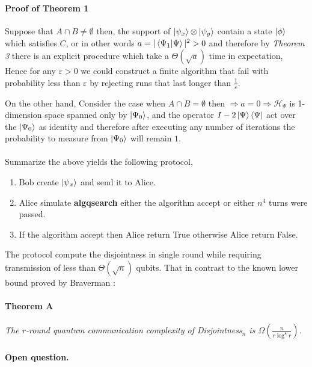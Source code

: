 \documentclass{article}
\begin{document}
\begin{multicols*}{2}
\paragraph{} 

\paragraph{Proof of Theorem 1} 
Suppose that \( A \cap B \neq \emptyset \) then, the support of \( \ket{\psi_x} \otimes \ket{\psi_y} \) contain a state \( \ket{\phi} \) which satisfies \(C\), or in other words $a = |\braket{\Psi_1|\Psi}|^2 > 0 $ and therefore by \textit{Theorem 3} there is an explicit procedure which take a $\Theta(\sqrt{a})$ time in expectation, Hence for any \(\varepsilon >0\) we could construct a finite algorithm that fail with probability less than $ \varepsilon $ by rejecting runs that last longer than $\frac{1}{\varepsilon}$. 
  
On the other hand, Consider the case when \(A \cap B = \emptyset\) then $\Rightarrow a = 0 \Rightarrow \mathcal{H}_{\Psi}$ is 1-dimension space spanned only by $\ket{\Psi_0} $, and the operator $ I - 2 \ket{\Psi}\bra{\Psi} $ act over the $ \ket{\Psi_0}  $ as identity and therefore after executing any number of iterations the probability to measure from $\ket{\Psi_0}$ will remain $1$.

\paragraph{}Summarize the above yields the following protocol,
\begin{enumerate}
    \item Bob create \( \ket{\psi_x} \) and send it to Alice.
    \item Alice simulate \textbf{algqsearch} either the algorithm accept or either $n^4$ turns were passed.     
    \item If the algorithm accept then Alice return True otherwise Alice return False. 
\end{enumerate}

The protocol compute the disjointness in single round while requiring transmission of less than $\Theta\left( \sqrt{n} \right)$ qubits. That in contrast to the known lower bound proved by Braverman \cite{Braverman}: 
\paragraph{Theorem A} \textit{The $r$-round quantum communication complexity of Disjointness$_n$ is $ \Omega\left( \frac{n}{r \log^8 r} \right)$.} 
\paragraph{Open question.} 
\printbibliography 
\end{multicols*}
\end{document}
